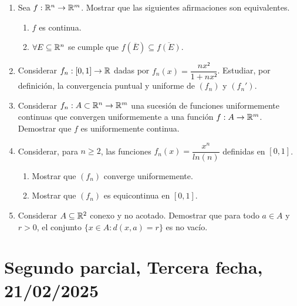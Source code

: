 \begin{enumerate}
  \item Sea \(f : \mathbb{R}^n \to \mathbb{R}^m\). Mostrar que las siguientes afirmaciones son equivalentes. \begin{enumerate}
          \item \(f\) es continua.
          \item \(\forall E \subseteq \mathbb{R}^n\) se cumple que \(f(\overline{E}) \subseteq \overline{f(E)} \).
        \end{enumerate}
  \item Considerar \(f_n : [0, 1] \to \mathbb{R} \) dadas por \(f_n(x) = \dfrac{nx²}{1+nx²} \). Estudiar, por definición, la convergencia puntual y uniforme de \((f_n)\) y \((f_n')\).
  \item Considerar \(f_n : A \subset \mathbb{R}^n \to \mathbb{R}^m\) una sucesión de funciones uniformemente continuas que convergen uniformemente a una función \(f: A \to \mathbb{R}^m\). Demostrar que \(f\) es uniformemente continua.
  \item Considerar, para \(n \geq 2\), las funciones \(f_n(x) = \dfrac{x^n}{ln(n)} \) definidas en \([0, 1]\). \begin{enumerate}
          \item Mostrar que \((f_n)\) converge uniformemente.
          \item Mostrar que \((f_n)\) es equicontinua en \([0, 1]\).
        \end{enumerate}
  \item Considerar \(A \subseteq \mathbb{R}^2\) conexo y no acotado. Demostrar que para todo \(a \in A\) y \(r > 0\), el conjunto \(\{ x \in A : d(x, a) = r \} \) es no vacío.
\end{enumerate}

\clearpage

\section{Segundo parcial, Tercera fecha, 21/02/2025}

